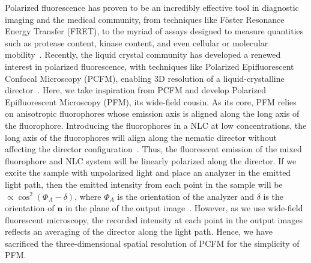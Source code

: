 Polarized fluorescence has proven to be an incredibly effective tool in diagnostic imaging and the medical community, from techniques like F\"oster Resonance Energy Transfer (FRET), to the myriad of assays designed to measure quantities such as protease content, kinase content, and even cellular or molecular mobility~\cite{RN282,RN284}.
Recently, the liquid crystal community has developed a renewed interest in polarized fluorescence, with techniques like Polarized Epifluorescent Confocal Microscopy (PCFM), enabling 3D resolution of a liquid-crystalline director~\cite{RN148,RN174}.
Here, we take inspiration from PCFM and develop Polarized Epifluorescent Microscopy (PFM), its wide-field cousin.
As its core, PFM relies on anisotropic fluorophores whose emission axis is aligned along the long axis of the fluorophore.
Introducing the fluorophores in a NLC at low concentrations, the long axis of the fluorophores will align along the nematic director without affecting the director configuration~\cite{RN148,RN174}.
Thus, the fluorescent emission of the mixed fluorophore and NLC system will be linearly polarized along the director.
If we excite the sample with unpolarized light and place an analyzer in the emitted light path, then the emitted intensity from each point in the sample will be $\propto \cos^2{(\Phi_A-\delta)}$, where $\Phi_A$ is the orientation of the analyzer and $\delta$ is the orientation of $\mathbf{n}$ in the plane of the output image~\cite{RN174}.
However, as we use wide-field fluorescent microscopy, the recorded intensity at each point in the output images reflects an averaging of the director along the light path.
Hence, we have sacrificed the three-dimensional spatial resolution of PCFM for the simplicity of PFM.
